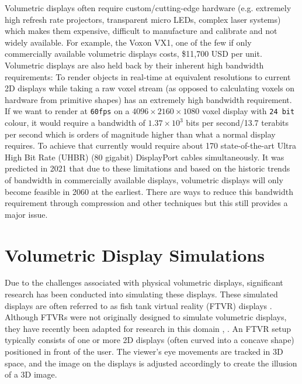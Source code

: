 Volumetric displays often require custom/cutting-edge hardware (e.g. extremely high refresh rate projectors,  transparent micro LEDs, complex laser systems) which makes them expensive, difficult to manufacture and calibrate and not widely available. For example, the Voxon VX1, one of the few if only commercially available volumetric displays costs, \$11,700 USD \cite{noauthor_products_nodate} per unit. \\

Volumetric displays are also held back by their inherent high bandwidth requirements: To render objects in real-time at equivalent resolutions to current 2D displays while taking a raw voxel stream (as opposed to calculating voxels on hardware from primitive shapes) has an extremely high bandwidth requirement. If we want to render at \texttt{60fps} on a $4096 \times 2160 \times 1080$ voxel display with \texttt{24 bit} colour, it would require a bandwidth of $1.37 \times 10^3$ bits per second/13.7 terabits per second which is orders of magnitude higher than what a normal display requires. To achieve that currently would require about 170 state-of-the-art Ultra High Bit Rate (UHBR) (80 gigabit) DisplayPort cables simultaneously. It was predicted in 2021 \cite{LAM2021050011} that due to these limitations and based on the historic trends of bandwidth in commercially available displays, volumetric displays will only become feasible in 2060 at the earliest. There are ways to reduce this bandwidth requirement through compression and other techniques \cite{4487481} but this still provides a major issue. 

\section{Volumetric Display Simulations}
Due to the challenges associated with physical volumetric displays, significant research has been conducted into simulating these displays. These simulated displays are often referred to as fish tank virtual reality (FTVR) displays \cite{10.1145/169059.169066}. Although FTVRs were not originally designed to simulate volumetric displays, they have recently been adapted for research in this domain \cite{10.1145/3281505.3281540}, \cite{Zabarauskas2012}. An FTVR setup typically consists of one or more 2D displays (often curved into a concave shape) positioned in front of the user. The viewer's eye movements are tracked in 3D space, and the image on the displays is adjusted accordingly to create the illusion of a 3D image. \\

